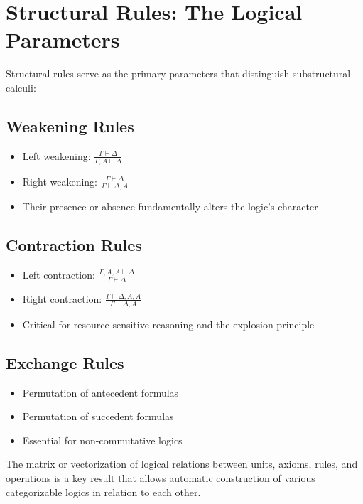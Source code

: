 \section*{Structural Rules: The Logical Parameters}
Structural rules serve as the primary parameters that distinguish substructural calculi:

\subsection*{Weakening Rules}
\begin{itemize}
    \item Left weakening: $\frac{\Gamma \vdash \Delta}{\Gamma, A \vdash \Delta}$
    \item Right weakening: $\frac{\Gamma \vdash \Delta}{\Gamma \vdash \Delta, A}$
    \item Their presence or absence fundamentally alters the logic's character
\end{itemize}

\subsection*{Contraction Rules}
\begin{itemize}
    \item Left contraction: $\frac{\Gamma, A, A \vdash \Delta}{\Gamma \vdash \Delta}$
    \item Right contraction: $\frac{\Gamma \vdash \Delta, A, A}{\Gamma \vdash \Delta, A}$
    \item Critical for resource-sensitive reasoning and the explosion principle
\end{itemize}

\subsection*{Exchange Rules}
\begin{itemize}
    \item Permutation of antecedent formulas
    \item Permutation of succedent formulas
    \item Essential for non-commutative logics
\end{itemize}

The matrix or vectorization of logical relations between units, axioms, rules, and operations is a key result that allows automatic construction of various categorizable logics in relation to each other.

